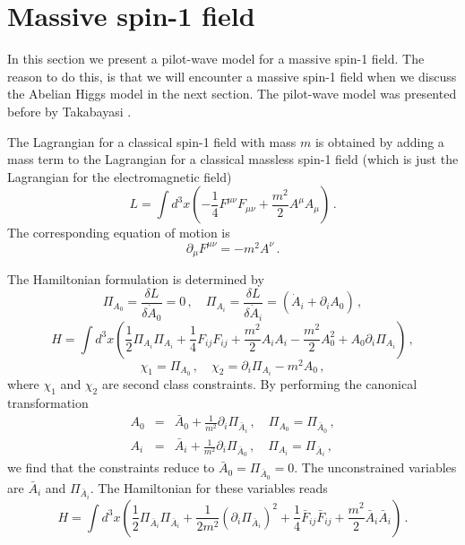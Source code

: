 \documentclass[12pt]{article}
\def\pa{\partial}
\begin{document}
\section{Massive spin-1 field}
In this section we present a pilot-wave model for a massive spin-1 field. The reason to do this, is that we will encounter a massive spin-1 field when we discuss the Abelian Higgs model in the next section. The pilot-wave model was presented before by Takabayasi \cite{takabayasi52}.

The Lagrangian for a classical spin-1 field with mass $m$ is obtained by adding a mass term to the Lagrangian for a classical massless spin-1 field (which is just the Lagrangian for the electromagnetic field)
\begin{equation}
L = \int d^3 x \left( -\frac{1}{4} F^{\mu \nu}F_{\mu \nu} + \frac{m^2}{2}  A^\mu A_\mu  \right) \,. 
\label{ms.1}
\end{equation}
The corresponding equation of motion is 
\begin{equation}
\partial_\mu F^{\mu \nu} = - m^2 A^\nu \,. 
\label{ms.2}
\end{equation}

The Hamiltonian formulation is determined by \cite[p.\ 35]{gitman90}
\begin{equation}
\Pi_{A_0} = \frac{\delta L }{\delta {\dot A_0} } = 0\,, \quad \Pi_{A_i} = \frac{\delta L }{\delta {\dot A_i} } = ({\dot A}_i +\partial_i A_0 )\,,
\label{ms.3}
\end{equation}
\begin{equation}
H = \int d^3 x \left( \frac{1}{2}\Pi_{A_i}\Pi_{A_i} + \frac{1}{4} F_{ij}F_{ij} + \frac{m^2}{2} A_iA_i - \frac{m^2}{2} A^2_0+A_0\partial_i \Pi_{A_i} \right) \,,
\label{ms.4}
\end{equation}
\begin{equation}
\chi_{1} = \Pi_{A_0} \,, \quad \chi_{2} = \partial_i \Pi_{A_i} - m^2A_0\,,
\label{ms.5}
\end{equation}
where $\chi_{1}$ and $\chi_{2}$ are second class constraints. By performing the canonical transformation
\begin{eqnarray}
A_0 &=& {\bar A}_0 +  \frac{1}{m^2} \pa_i \Pi_{{\bar A}_i} \,, \quad \Pi_{A_0} = \Pi_{{\bar A}_0} \,, \nonumber\\
A_i &=& {\bar A}_i +  \frac{1}{m^2} \pa_i \Pi_{{\bar A}_0}  \,, \quad \Pi_{A_i} = \Pi_{{\bar A}_i} \,,
\label{ms.6}
\end{eqnarray}
we find that the constraints reduce to ${\bar A}_0=\Pi_{{\bar A}_0}=0$. The unconstrained variables are ${\bar A}_i$ and $\Pi_{{\bar A}_i}$. The Hamiltonian for these variables reads
\begin{equation}
H = \int d^3 x \left( \frac{1}{2}\Pi_{{\bar A}_i}\Pi_{{\bar A}_i} + \frac{1}{2m^2}\left( \partial_i \Pi_{{\bar A}_i}  \right)^2  + \frac{1}{4} {\bar F}_{ij}{\bar F}_{ij}  +  \frac{m^2}{2}  {\bar A}_i {\bar A}_i \right)\,.
\label{ms.7}
\end{equation}
\end{document}
